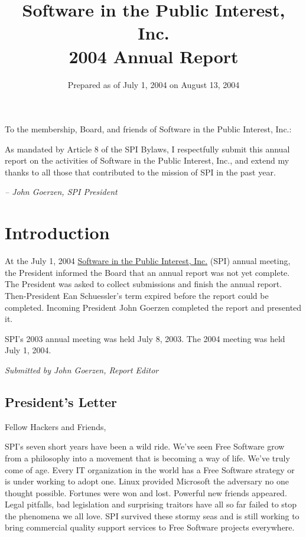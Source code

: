 \documentclass[letterpaper]{report}
\begin{document}
\title{Software in the Public Interest, Inc.\\
2004 Annual Report}
\date{Prepared as of July 1, 2004 on August 13, 2004}

\maketitle
To the membership, Board, and friends of Software in the Public Interest,
Inc.:

As mandated by Article 8 of the SPI Bylaws, I respectfully submit
this annual report on the activities of Software in the Public Interest,
Inc., and extend my thanks to all those that contributed to the mission
of SPI in the past year.

\emph{-- John Goerzen, SPI President}

\newpage

\tableofcontents

\newpage

\chapter{Introduction}

At the July 1, 2004 \href{https://www.spi-inc.org/}{Software in the Public Interest, Inc.}
(SPI) annual meeting, the President informed the Board that an annual
report was not yet complete. The President was asked to collect submissions
and finish the annual report. Then-President Ean Schuessler's term
expired before the report could be completed. Incoming President John
Goerzen completed the report and presented it.

SPI's 2003 annual meeting was held July 8, 2003. The 2004 meeting
was held July 1, 2004.

\emph{Submitted by John Goerzen, Report Editor}


\section{President's Letter}
\label{sec:president}

Fellow Hackers and Friends,

SPI's seven short years have been a wild ride. We've seen Free Software
grow from a philosophy into a movement that is becoming a way of life.
We've truly come of age. Every IT organization in the world has a
Free Software strategy or is under working to adopt one. Linux provided
Microsoft the adversary no one thought possible. Fortunes were won
and lost. Powerful new friends appeared. Legal pitfalls, bad legislation
and surprising traitors have all so far failed to stop the phenomena
we all love. SPI survived these stormy seas and is still working to
bring commercial quality support services to Free Software projects
everywhere.
\end{document}
